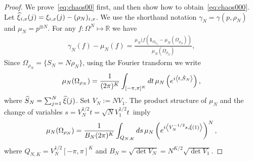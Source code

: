\documentclass[10pt,a4paper]{article}
\newcommand{\ind}{\mathbf{1}}
\newcommand{\bbR}{\mathbb{R}}
\let\g=\gamma
\let\r=\rho
\let\O=\Omega
\let\oldhat\hat
\renewcommand*{\hat}[1]{\mathchoice{\widehat{#1}}{\widehat{#1}}{\oldhat{#1}}{\oldhat{#1}}}
\begin{document}
\begin{proof}
We prove~\eqref{eq:chaos00} first, and then show how to obtain~\eqref{eq:chaos000}. Let $\hat \xi_{i,x}(j)=\xi_{i,x}(j)-(\r_N)_{i,x}$. We use the shorthand notation $\g_N=\g(p,\r_N)$ and $\mu_N=p^{\otimes N}$. For any $f:\O^N\mapsto\bbR$ we have
\begin{align}\label{eq:chao1}
\g_N(f)-\mu_N(f)=\frac{\mu_N(f(\ind_{\O_{\r_N}}-\mu_N(\O_{\r_N}))}{\mu_N(\O_{\r_N})},
\end{align}
Since $\O_{\r_N}=\{S_N=N\r_N\}$, using the Fourier transform we write
\begin{align}\label{eq:chao2}
\mu_N(\O_{\r_N})=\frac1{(2\pi)^K}\int_{[-\pi,\pi]^K}d t \,\mu_N\left(e^{i\left\langle t,\hat S_N\right\rangle}\right),
\end{align}
where $\hat S_N=\sum_{j=1}^N\hat\xi(j)$. Set $V_N:=N V_1$. The product structure of $\mu_N$ and the change of variables $s= V_N^{1/2} t=\sqrt N V_1^{1/2} t\,$ imply
\begin{align}\label{eq:chao3}
\mu_N(\O_{\r_N})=\frac1{B_N(2\pi)^K}\int_{Q_{N,K}}d s \,\mu_N\left(e^{i\left\langle V_N^{-1/2} s,\hat\xi(1)\right\rangle}\right)^N,
\end{align}
where $Q_{N,K}=V_N^{1/2}[-\pi,\pi]^K$ and $B_N = \sqrt {\det V_N}=N^{K/2}\sqrt {\det V_1}$.


\end{proof}
\end{document}
